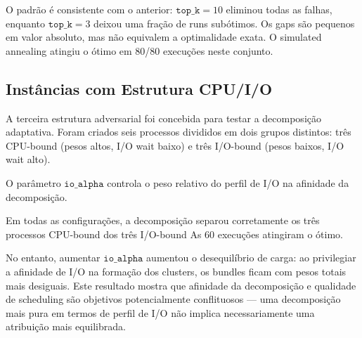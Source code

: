 O padrão é consistente com o anterior: $\mathtt{top\_k}=10$ eliminou todas as falhas,
enquanto $\mathtt{top\_k}=3$ deixou uma fração de runs subótimos. Os gaps são pequenos
em valor absoluto, mas não equivalem a optimalidade exata. O simulated annealing atingiu
o ótimo em 80/80 execuções neste conjunto.

\subsection{Instâncias com Estrutura CPU/I\slash O}

A terceira estrutura adversarial foi concebida para testar a decomposição adaptativa. Foram criados seis processos divididos em dois grupos
distintos: três CPU-bound (pesos altos, I/O wait baixo) e três I/O-bound (pesos baixos,
I/O wait alto). 

O parâmetro $\mathtt{io\_alpha}$ controla o peso relativo do perfil de
I/O na afinidade da decomposição.

\begin{table}[H]
\centering
{}
\caption{Resultados do clustering CPU/I/O para diferentes valores de \texttt{io\_alpha} ($N=6$, $K=2$).}
\label{tab:resultados-e1c}
\end{table}

Em todas as configurações, a decomposição separou corretamente os três processos
CPU-bound dos três I/O-bound As 60 execuções atingiram o ótimo.

No entanto, aumentar $\mathtt{io\_alpha}$ aumentou o desequilíbrio de carga: ao
privilegiar a afinidade de I/O na formação dos clusters, os bundles ficam com pesos
totais mais desiguais. Este resultado mostra que afinidade da decomposição e qualidade
de scheduling são objetivos potencialmente conflituosos --- uma decomposição mais pura em
termos de perfil de I/O não implica necessariamente uma atribuição mais equilibrada.
